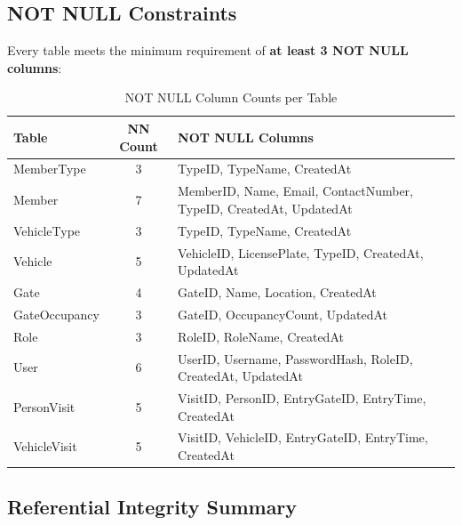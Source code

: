 \documentclass[a4paper, 12pt]{article}
\begin{document}
\subsection{NOT NULL Constraints}

Every table meets the minimum requirement of \textbf{at least 3 NOT NULL columns}:

\begin{table}[H]
\centering
\caption{NOT NULL Column Counts per Table}
\label{tab:notnull}
\begin{tabularx}{\textwidth}{l c X}
\toprule
\textbf{Table} & \textbf{NN Count} & \textbf{NOT NULL Columns} \\
\midrule
MemberType & 3 & TypeID, TypeName, CreatedAt \\
Member & 7 & MemberID, Name, Email, ContactNumber, TypeID, CreatedAt, UpdatedAt \\
VehicleType & 3 & TypeID, TypeName, CreatedAt \\
Vehicle & 5 & VehicleID, LicensePlate, TypeID, CreatedAt, UpdatedAt \\
Gate & 4 & GateID, Name, Location, CreatedAt \\
GateOccupancy & 3 & GateID, OccupancyCount, UpdatedAt \\
Role & 3 & RoleID, RoleName, CreatedAt \\
User & 6 & UserID, Username, PasswordHash, RoleID, CreatedAt, UpdatedAt \\
PersonVisit & 5 & VisitID, PersonID, EntryGateID, EntryTime, CreatedAt \\
VehicleVisit & 5 & VisitID, VehicleID, EntryGateID, EntryTime, CreatedAt \\
\bottomrule
\end{tabularx}
\end{table}

\subsection{Referential Integrity Summary}
\end{document}
